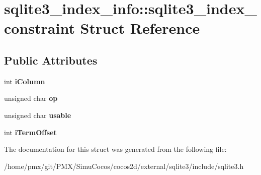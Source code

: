 \hypertarget{structsqlite3__index__info_1_1sqlite3__index__constraint}{}\section{sqlite3\+\_\+index\+\_\+info\+:\+:sqlite3\+\_\+index\+\_\+constraint Struct Reference}
\label{structsqlite3__index__info_1_1sqlite3__index__constraint}
\subsection*{Public Attributes}
\begin{DoxyCompactItemize}
\item 
\mbox{\label{structsqlite3__index__info_1_1sqlite3__index__constraint_a0f1e207060420058ee2881f2ea368e3a}} 
int {\bfseries i\+Column}
\item 
\mbox{\label{structsqlite3__index__info_1_1sqlite3__index__constraint_a362f4ec1f71975cb0ac39a8b5e4b1476}} 
unsigned char {\bfseries op}
\item 
\mbox{\label{structsqlite3__index__info_1_1sqlite3__index__constraint_ae16e62caeab743cc68bb22227dacb501}} 
unsigned char {\bfseries usable}
\item 
\mbox{\label{structsqlite3__index__info_1_1sqlite3__index__constraint_a4e8368da66f34b7f07b369984b813d1b}} 
int {\bfseries i\+Term\+Offset}
\end{DoxyCompactItemize}


The documentation for this struct was generated from the following file\+:\begin{DoxyCompactItemize}
\item 
/home/pmx/git/\+P\+M\+X/\+Simu\+Cocos/cocos2d/external/sqlite3/include/sqlite3.\+h\end{DoxyCompactItemize}

